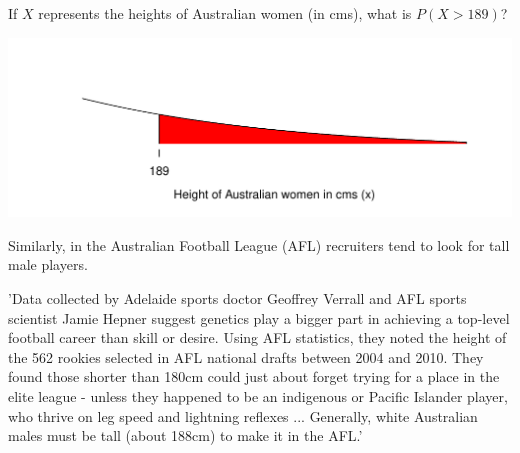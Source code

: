 \documentclass[t,xcolor=pdftex,dvipsnames,table]{beamer}
\makeatletter
\def\maxwidth{ %
  \ifdim\Gin@nat@width>\linewidth
    \linewidth
  \else
    \Gin@nat@width
  \fi
}
\newenvironment{knitrout}{}{} %
\makeatother
\begin{document}
\begin{frame}{}

If $X$ represents the heights of Australian women (in cms), what is $P(X > 189)$?

\vspace{1cm}
\begin{knitrout}
\color{fgcolor}
\includegraphics[width=\maxwidth]{figure/unnamed-chunk-2-1} 

\end{knitrout}
\end{frame}



\begin{frame}[fragile]{}

Similarly, in the Australian Football League (AFL) recruiters tend to look for tall male players.

\vspace{.5cm}
'Data collected by Adelaide sports doctor Geoffrey Verrall and AFL sports scientist Jamie Hepner suggest genetics play a bigger part in achieving a top-level football career than skill or desire. Using AFL statistics, they noted the height of the 562 rookies selected in AFL national drafts between 2004 and 2010. They found those shorter than 180cm could just about forget trying for a place in the elite league - unless they happened to be an indigenous or Pacific Islander player, who thrive on leg speed and lightning reflexes ... Generally, white Australian males must be tall (about 188cm) to  make it in the AFL.'
\href{http://www.heraldsun.com.au/sport/afl/size-matters-at-afl-level/story-e6frf9jf-1226650225771}{}
\end{frame}
\end{document}
